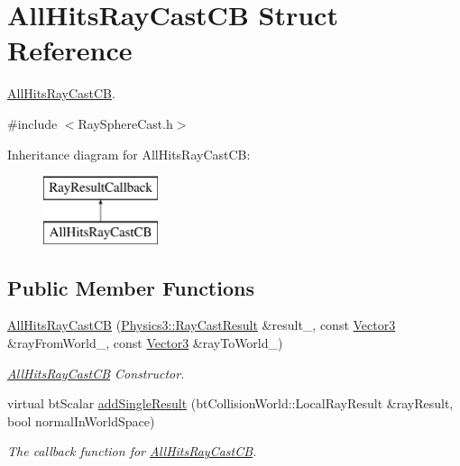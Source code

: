 \hypertarget{struct_all_hits_ray_cast_c_b}{}\section{All\+Hits\+Ray\+Cast\+CB Struct Reference}
\label{struct_all_hits_ray_cast_c_b}


\hyperlink{struct_all_hits_ray_cast_c_b}{All\+Hits\+Ray\+Cast\+CB}.  




{\ttfamily \#include $<$Ray\+Sphere\+Cast.\+h$>$}

Inheritance diagram for All\+Hits\+Ray\+Cast\+CB\+:\begin{figure}[H]
\begin{center}
\leavevmode
\includegraphics[height=2.000000cm]{struct_all_hits_ray_cast_c_b}
\end{center}
\end{figure}
\subsection*{Public Member Functions}
\begin{DoxyCompactItemize}
\item 
\hyperlink{struct_all_hits_ray_cast_c_b_ae11a45ede9786742d1bda104784a611b}{All\+Hits\+Ray\+Cast\+CB} (\hyperlink{class_magnum_1_1_physics3_1_1_ray_cast_result}{Physics3\+::\+Ray\+Cast\+Result} \&result\+\_\+, const \hyperlink{class_magnum_1_1_vector3}{Vector3} \&ray\+From\+World\+\_\+, const \hyperlink{class_magnum_1_1_vector3}{Vector3} \&ray\+To\+World\+\_\+)
\begin{DoxyCompactList}\small\item\em \hyperlink{struct_all_hits_ray_cast_c_b}{All\+Hits\+Ray\+Cast\+CB} Constructor. \end{DoxyCompactList}\item 
virtual bt\+Scalar \hyperlink{struct_all_hits_ray_cast_c_b_a5e045ff69c21d4fa3c61b16097fa8e8b}{add\+Single\+Result} (bt\+Collision\+World\+::\+Local\+Ray\+Result \&ray\+Result, bool normal\+In\+World\+Space)
\begin{DoxyCompactList}\small\item\em The callback function for \hyperlink{struct_all_hits_ray_cast_c_b}{All\+Hits\+Ray\+Cast\+CB}. \end{DoxyCompactList}\end{DoxyCompactItemize}
